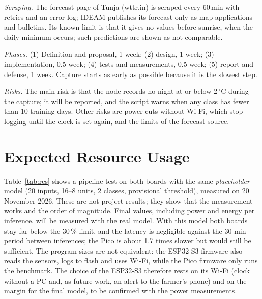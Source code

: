 \documentclass[conference]{IEEEtran}
\begin{document}
\textit{Scraping.} The forecast page of Tunja (wttr.in) is scraped every 60\,min with retries and an error log; IDEAM publishes its forecast only as map applications and bulletins. Its known limit is that it gives no values before sunrise, when the daily minimum occurs; such predictions are shown as not comparable.

\textit{Phases.} (1) Definition and proposal, 1 week; (2) design, 1 week; (3) implementation, 0.5 week; (4) tests and measurements, 0.5 week; (5) report and defense, 1 week. Capture starts as early as possible because it is the slowest step.

\textit{Risks.} The main risk is that the node records no night at or below 2\,$^\circ$C during the capture; it will be reported, and the script warns when any class has fewer than 10 training days. Other risks are power cuts without Wi-Fi, which stop logging until the clock is set again, and the limits of the forecast source.

\section{Expected Resource Usage}
Table~\ref{tab:res} shows a pipeline test on both boards with the same \textit{placeholder} model (20 inputs, 16--8 units, 2 classes, provisional threshold), measured on 20 November 2026. These are not project results; they show that the measurement works and the order of magnitude. Final values, including power and energy per inference, will be measured with the real model. With this model both boards stay far below the 30\,\% limit, and the latency is negligible against the 30-min period between inferences; the Pico is about 1.7 times slower but would still be sufficient. The program sizes are not equivalent: the ESP32-S3 firmware also reads the sensors, logs to flash and uses Wi-Fi, while the Pico firmware only runs the benchmark. The choice of the ESP32-S3 therefore rests on its Wi-Fi (clock without a PC and, as future work, an alert to the farmer's phone) and on the margin for the final model, to be confirmed with the power measurements.
\end{document}
